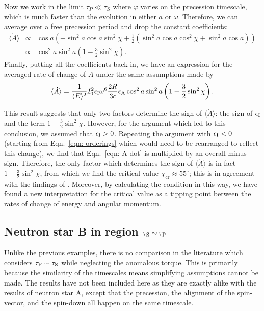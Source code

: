 \documentclass[../full_thesis/full_thesis.tex]{subfiles}
\begin{document}
Now we work in the limit $\tau_P \ll \tau_S$ where $\varphi$ varies on the
precession timescale, which is much faster than the evolution in either $a$ or $\omega$.
Therefore, we can average over a free precession period and drop the constant
coefficients:
\begin{align}
\langle\dot{A}\rangle &\propto& \cos a \left(-\sin^{2}a\cos a \sin^{2}\chi +
       \frac{1}{2}\left(\sin^{2}a\cos a \cos^{2}\chi +
       \sin^{2}a \cos a \right) \right) \\
& \propto& \cos^{2} a \sin^{2}a\left(1-\frac{3}{2}\sin^{2}\chi\right).
\end{align}
Finally, putting all the coefficients back in, we have an expression for the averaged
rate of change of $A$ under the same assumptions made by \citet{Goldreich1970}
\begin{equation}
\langle \dot{A} \rangle =\frac{1}{\langle E\rangle ^{2}}I_{0}^{2}
                         \epsilon_{\mathrm{I}}\omega^{6}\frac{2R}{3c}\epsilon_{\mathrm{A}}
                         \cos^{2} a \sin^{2}a
                         \left(1-\frac{3}{2}\sin^{2}\chi\right).
\label{eqn: A dot}
\end{equation}

This result suggests that only two factors determine the sign of
$\langle\dot{A}\rangle$: the sign of $\epsilon_{\mathrm{I}}$ and the term
$1-\frac{3}{2}\sin^{2}\chi$. However, for the argument which led to this
conclusion, we assumed that $\epsilon_{\mathrm{I}} > 0$. Repeating the argument with $\epsilon_{\mathrm{I}} <
0$ (starting from Eqn.~\eqref{eqn: orderings} which would need to be rearranged
to reflect this change), we find that Eqn.~\eqref{eqn: A dot} is multiplied by
an overall minus sign. Therefore, the only factor which determines the sign of
$\langle\dot{A}\rangle$ is in fact $1-\frac{3}{2}\sin^{2}\chi$, from which we
find the critical value $\chi_\textrm{cr}\approx55^\circ$; this is
in agreement with the findings of \citet{Goldreich1970}.  Moreover, by
calculating the condition in this way, we have found a new interpretation for
the critical value as a tipping point between the rates of change of energy and
angular momentum.

\subsection{Neutron star B in region \texorpdfstring{$\tau_{\mathrm{S}}\sim \tau_{\mathrm{P}}$}{}}
\label{sec: B_NA}
Unlike the previous examples, there is no comparison in the literature which
considers $\tau_{\mathrm{P}}\sim\tau_{\mathrm{S}}$ while neglecting the anomalous torque. This is
primarily because the similarity of the timescales means simplifying
assumptions cannot be made. The results have not been included here as they are
exactly alike with the results of neutron star A, except that the
precession, the alignment of the spin-vector, and the
spin-down all happen on the same timescale.
\end{document}
